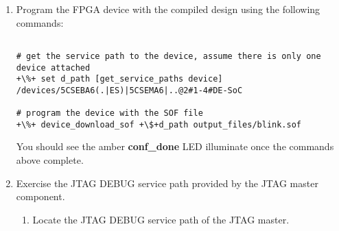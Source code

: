\begin{flushleft}
\begin{enumerate}[
	label=\textbf{Step \arabic*.},
	leftmargin=*,
	widest={00},
	align=left]
\begin{verbatim}
+\%+ help get_service_paths
Returns a list of paths to nodes that implement the requested service type.
Service paths can be filtered based on a number of different optional
parameters.
	Arguments:
	  ?-type <component-type>?
	  ?-hpath <hpath-prefix>?
	  ?-device <device-path>?
	  <service-type>

Examples:
To list all paths to nodes that implement a supported service type:
	  get_service_paths <service-type>
To list all paths to nodes that implement the requested service type under a
specific hpath:
	  get_service_paths -hpath <hpath-prefix> <service-type>
To list all paths to nodes attached to a specific component type that implement
the requested service:
	  get_service_paths -type <component-type> <service-type>
To list all paths to nodes on a specific device that implement the requested
service type:
	  get_service_paths -device <device-path> <service-type>

\end{verbatim}

\item Program the FPGA device with the compiled design using the following commands:

\begin{verbatim}

# get the service path to the device, assume there is only one device attached
+\%+ set d_path [get_service_paths device]
/devices/5CSEBA6(.|ES)|5CSEMA6|..@2#1-4#DE-SoC

# program the device with the SOF file
+\%+ device_download_sof +\$+d_path output_files/blink.sof

\end{verbatim}

You should see the amber \textbf{conf\_done} LED illuminate once the commands above complete.

\newpage

\item Exercise the JTAG DEBUG service path provided by the JTAG master component.

\begin{enumerate}[
	label=\textbf{Step \arabic{enumi}\alph*.},
	leftmargin=*,
	align=left]

\item Locate the JTAG DEBUG service path of the JTAG master.

\begin{verbatim}


\end{verbatim}
\end{enumerate}
\end{enumerate}
\end{flushleft}
